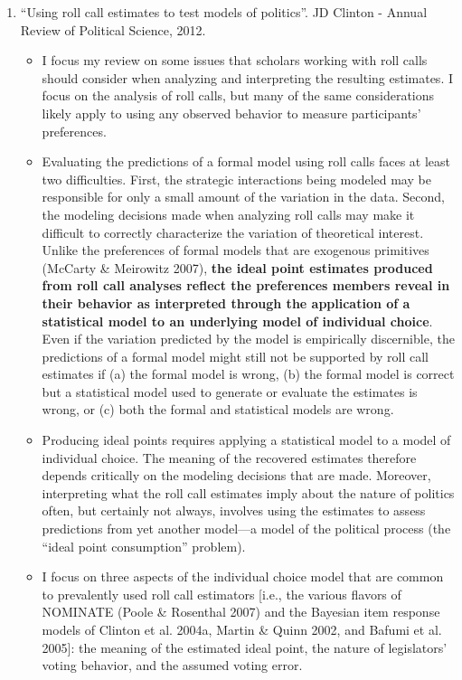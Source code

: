 \documentclass[a4paper,12pt]{article}
\begin{document}
\begin{enumerate}
\newpage

\item “Using roll call estimates to test models of politics”. JD Clinton - Annual Review of Political Science, 2012. 
\begin{itemize}
\item I focus my review on some issues that scholars working with roll calls should consider when analyzing and interpreting the resulting estimates. I focus on the analysis of roll calls, but many of the same considerations likely apply to using any observed behavior to measure participants’ preferences. 
\item Evaluating the predictions of a formal model using roll calls faces at least two difficulties. First, the strategic interactions being modeled may be responsible for only a small amount of the variation in the data. Second, the modeling decisions made when analyzing roll calls may make it difficult to correctly characterize the variation of theoretical interest. Unlike the preferences of formal models that are exogenous primitives (McCarty \& Meirowitz 2007), \textbf{the ideal point estimates produced from roll call analyses reflect the preferences members reveal in their behavior as interpreted through the application of a statistical model to an underlying model of individual choice}. Even if the variation predicted by the model is empirically discernible, the predictions of a formal model might still not be supported by roll call estimates if (a) the formal model is wrong, (b) the formal model is correct but a statistical model used to generate or evaluate the estimates is wrong, or (c) both the formal and statistical models are wrong. 
\item Producing ideal points requires applying a statistical model to a model of individual choice. The meaning of the recovered estimates therefore depends critically on the modeling decisions that are made. Moreover, interpreting what the roll call estimates imply about the nature of politics often, but certainly not always, involves using the estimates to assess predictions from yet another model—a model of the political process (the “ideal point consumption” problem). 
\item I focus on three aspects of the individual choice model that are common to prevalently used roll call estimators [i.e., the various flavors of NOMINATE (Poole \& Rosenthal 2007) and the Bayesian item response models of Clinton et al. 2004a, Martin \& Quinn 2002, and Bafumi et al. 2005]: the meaning of the estimated ideal point, the nature of legislators’ voting behavior, and the assumed voting error.  

\end{itemize}
\end{enumerate}
\end{document}
